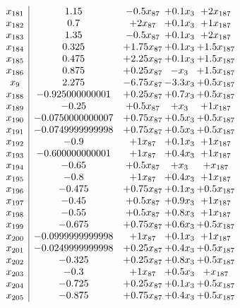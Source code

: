 \documentclass[11pt]{article}
\begin{document}
\[\begin{array}{c| c c@{\hskip 2pt} c@{\hskip 2pt} c@{\hskip 2pt} }
 x_{181}   &  1.15 & -0.5 x_{87} & + 0.1 x_{3} & + 2 x_{187}\\
 x_{182}   &  0.7 & + 2 x_{87} & + 0.1 x_{3} & + 1 x_{187}\\
 x_{183}   &  1.35 & -0.5 x_{87} & + 0.1 x_{3} & + 2 x_{187}\\
 x_{184}   &  0.325 & + 1.75 x_{87} & + 0.1 x_{3} & + 1.5 x_{187}\\
 x_{185}   &  0.475 & + 2.25 x_{87} & + 0.1 x_{3} & + 1.5 x_{187}\\
 x_{186}   &  0.875 & + 0.25 x_{87} & - x_{3} & + 1.5 x_{187}\\
 x_{9}   &  2.275 & -6.75 x_{87} & -3.3 x_{3} & + 0.5 x_{187}\\
 x_{188}   &  -0.925000000001 & + 0.25 x_{87} & + 0.7 x_{3} & + 0.5 x_{187}\\
 x_{189}   &  -0.25 & + 0.5 x_{87} & +  x_{3} & + 1 x_{187}\\
 x_{190}   &  -0.0750000000007 & + 0.75 x_{87} & + 0.5 x_{3} & + 0.5 x_{187}\\
 x_{191}   &  -0.0749999999998 & + 0.75 x_{87} & + 0.5 x_{3} & + 0.5 x_{187}\\
 x_{192}   &  -0.9 & + 1 x_{87} & + 0.1 x_{3} & + 1 x_{187}\\
 x_{193}   &  -0.600000000001 & + 1 x_{87} & + 0.4 x_{3} & + 1 x_{187}\\
 x_{194}   &  -0.65 & + 0.5 x_{87} & +  x_{3} & +  x_{187}\\
 x_{195}   &  -0.8 & + 1 x_{87} & + 0.4 x_{3} & + 1 x_{187}\\
 x_{196}   &  -0.475 & + 0.75 x_{87} & + 0.1 x_{3} & + 0.5 x_{187}\\
 x_{197}   &  -0.45 & + 0.5 x_{87} & + 0.9 x_{3} & + 1 x_{187}\\
 x_{198}   &  -0.55 & + 0.5 x_{87} & + 0.8 x_{3} & + 1 x_{187}\\
 x_{199}   &  -0.675 & + 0.75 x_{87} & + 0.6 x_{3} & + 0.5 x_{187}\\
 x_{200}   &  -0.0999999999998 & + 1 x_{87} & + 0.1 x_{3} & + 1 x_{187}\\
 x_{201}   &  -0.0249999999998 & + 0.25 x_{87} & + 0.4 x_{3} & + 0.5 x_{187}\\
 x_{202}   &  -0.325 & + 0.25 x_{87} & + 0.8 x_{3} & + 0.5 x_{187}\\
 x_{203}   &  -0.3 & + 1 x_{87} & + 0.5 x_{3} & +  x_{187}\\
 x_{204}   &  -0.725 & + 0.25 x_{87} & + 0.1 x_{3} & + 0.5 x_{187}\\
 x_{205}   &  -0.875 & + 0.75 x_{87} & + 0.4 x_{3} & + 0.5 x_{187}\\

\end{array}\]
\end{document}
